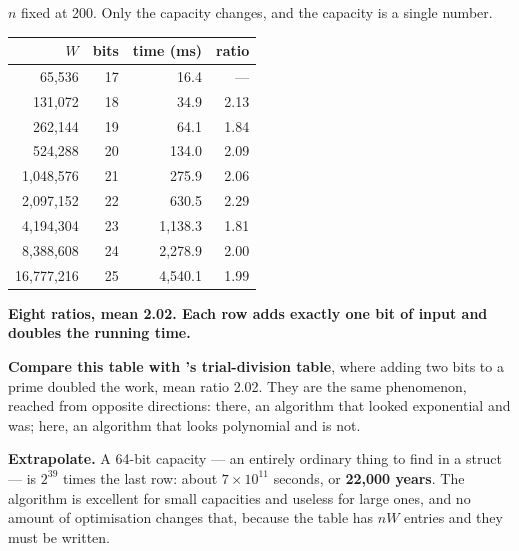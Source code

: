 \begin{worked}
$n$ fixed at 200. Only the capacity changes, and the capacity is a single
number.

\begin{center}
\begin{tabular}{@{}rrrr@{}}
\toprule
\rowcolor{primary!15}
$W$ & bits & time (ms) & ratio \\
\midrule
      65{,}536 & 17 &    16.4 & ---  \\
     131{,}072 & 18 &    34.9 & 2.13 \\
     262{,}144 & 19 &    64.1 & 1.84 \\
     524{,}288 & 20 &   134.0 & 2.09 \\
   1{,}048{,}576 & 21 &   275.9 & 2.06 \\
   2{,}097{,}152 & 22 &   630.5 & 2.29 \\
   4{,}194{,}304 & 23 & 1{,}138.3 & 1.81 \\
   8{,}388{,}608 & 24 & 2{,}278.9 & 2.00 \\
  16{,}777{,}216 & 25 & 4{,}540.1 & 1.99 \\
\bottomrule
\end{tabular}
\end{center}

\smallskip
\textbf{Eight ratios, mean 2.02. Each row adds exactly one bit of input and
doubles the running time.}

\smallskip
\textbf{Compare this table with 's trial-division table}, where
adding two bits to a prime doubled the work, mean ratio 2.02. They are the same
phenomenon, reached from opposite directions: there, an algorithm that looked
exponential and was; here, an algorithm that looks polynomial and is not.

\smallskip
\textbf{Extrapolate.} A 64-bit capacity --- an entirely ordinary thing to find
in a struct --- is $2^{39}$ times the last row: about $7 \times 10^{11}$
seconds, or \textbf{22{,}000 years}. The algorithm is excellent for small
capacities and useless for large ones, and no amount of optimisation changes
that, because the table has $nW$ entries and they must be written.
\end{worked}

